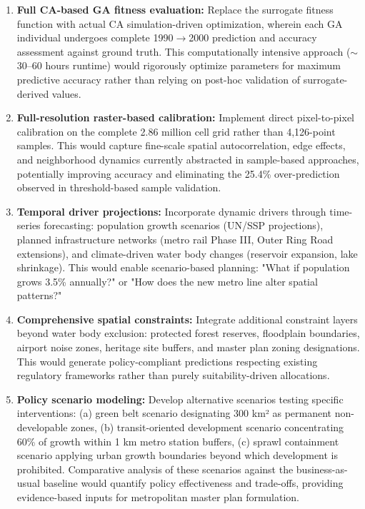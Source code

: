 \documentclass[12pt,a4paper]{article}
\begin{document}
\begin{enumerate}
\item \textbf{Full CA-based GA fitness evaluation:} Replace the surrogate fitness function with actual CA simulation-driven optimization, wherein each GA individual undergoes complete 1990$\rightarrow$2000 prediction and accuracy assessment against ground truth. This computationally intensive approach ($\sim$30--60 hours runtime) would rigorously optimize parameters for maximum predictive accuracy rather than relying on post-hoc validation of surrogate-derived values.

\item \textbf{Full-resolution raster-based calibration:} Implement direct pixel-to-pixel calibration on the complete 2.86 million cell grid rather than 4,126-point samples. This would capture fine-scale spatial autocorrelation, edge effects, and neighborhood dynamics currently abstracted in sample-based approaches, potentially improving accuracy and eliminating the 25.4\% over-prediction observed in threshold-based sample validation.

\item \textbf{Temporal driver projections:} Incorporate dynamic drivers through time-series forecasting: population growth scenarios (UN/SSP projections), planned infrastructure networks (metro rail Phase III, Outer Ring Road extensions), and climate-driven water body changes (reservoir expansion, lake shrinkage). This would enable scenario-based planning: "What if population grows 3.5\% annually?" or "How does the new metro line alter spatial patterns?"

\item \textbf{Comprehensive spatial constraints:} Integrate additional constraint layers beyond water body exclusion: protected forest reserves, floodplain boundaries, airport noise zones, heritage site buffers, and master plan zoning designations. This would generate policy-compliant predictions respecting existing regulatory frameworks rather than purely suitability-driven allocations.

\item \textbf{Policy scenario modeling:} Develop alternative scenarios testing specific interventions: (a) green belt scenario designating 300 km² as permanent non-developable zones, (b) transit-oriented development scenario concentrating 60\% of growth within 1 km metro station buffers, (c) sprawl containment scenario applying urban growth boundaries beyond which development is prohibited. Comparative analysis of these scenarios against the business-as-usual baseline would quantify policy effectiveness and trade-offs, providing evidence-based inputs for metropolitan master plan formulation.
\end{enumerate}
\end{document}
